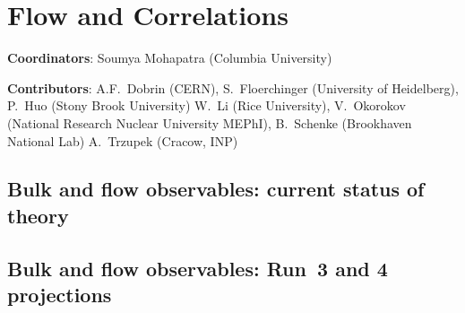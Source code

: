 \documentclass[../report.tex]{subfiles}
\providecommand{\main}{..}
\begin{document}
\section{Flow and Correlations}
\label{sec:flow}

{ \small
\noindent \textbf{Coordinators}: Soumya Mohapatra (Columbia University)

\noindent \textbf{Contributors}: 
A.F.~Dobrin (CERN), 
S.~Floerchinger (University of Heidelberg), 
P.~Huo (Stony Brook University)
W.~Li (Rice University), 
V.~Okorokov (National Research Nuclear University MEPhI), 
B.~Schenke (Brookhaven National Lab)
A.~Trzupek (Cracow, INP)
}

\subsection{Bulk and flow observables: current status of theory}
\FloatBarrier
\subsection{Bulk and flow observables: Run~3 and 4 projections}
\FloatBarrier
\FloatBarrier
\FloatBarrier
\FloatBarrier
\FloatBarrier
\end{document}

